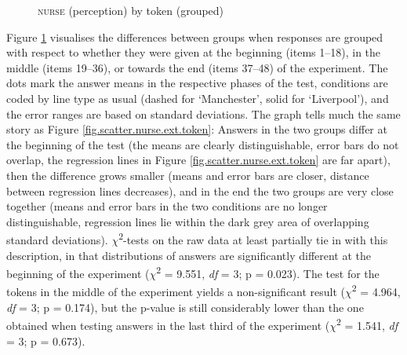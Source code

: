 \begin{figure}[h]
	\centering
		\resizebox{.49\linewidth}{!}{} 
	\caption{\textsc{nurse} (perception) by token (grouped)}
	\label{fig.line.nurse.ext.token}
\end{figure}

Figure \ref{fig.line.nurse.ext.token} visualises the differences between  groups when responses are grouped with respect to whether they were given at the beginning (items 1--18), in the middle (items 19--36), or towards the end (items 37--48) of the experiment.
The dots mark the answer means in the respective phases of the test,  conditions are coded by line type as usual (dashed for `Manchester', solid for `Liverpool'), and the error ranges are based on standard deviations.
The graph tells much the same story as Figure \ref{fig.scatter.nurse.ext.token}: Answers in the two groups differ at the beginning of the test (the means are clearly distinguishable, error bars do not overlap, the regression lines in Figure \ref{fig.scatter.nurse.ext.token} are far apart), then the difference grows smaller (means and error bars are closer, distance between regression lines decreases), and in the end the two groups are very close together (means and error bars in the two conditions are no longer distinguishable, regression lines lie within the dark grey area of overlapping standard deviations).
\(\chi\)\textsuperscript{2}-tests on the raw data at least partially tie in with this description, in that distributions of answers are significantly different at the beginning of the experiment (\(\chi\)\textsuperscript{2} = 9.551, \emph{df} = 3; p = 0.023).
The test for the tokens in the middle of the experiment yields a non-significant result (\(\chi\)\textsuperscript{2} = 4.964, \emph{df} = 3; p = 0.174), but the p-value is still considerably lower than the one obtained when testing answers in the last third of the experiment (\(\chi\)\textsuperscript{2} = 1.541, \emph{df} = 3; p = 0.673).

